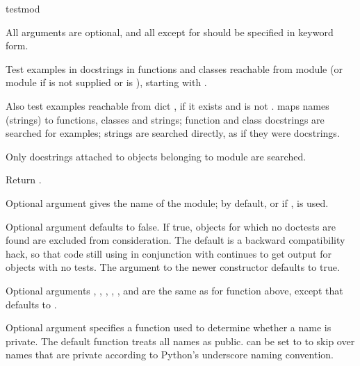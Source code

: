 \begin{funcdesc}{testmod}{}

  All arguments are optional, and all except for  should be
  specified in keyword form.

  Test examples in docstrings in functions and classes reachable
  from module  (or module  if  is not
  supplied or is ), starting with .

  Also test examples reachable from dict , if it
  exists and is not .   maps
  names (strings) to functions, classes and strings; function and class
  docstrings are searched for examples; strings are searched directly,
  as if they were docstrings.

  Only docstrings attached to objects belonging to module  are
  searched.

  Return .

  Optional argument  gives the name of the module; by default,
  or if ,  is used.

  Optional argument  defaults to false.  If true,
  objects for which no doctests are found are excluded from consideration.
  The default is a backward compatibility hack, so that code still
  using  in conjunction with
   continues to get output for objects with no tests.
  The  argument to the newer 
  constructor defaults to true.

  Optional arguments , , ,
  , , and  are the same as
  for function  above, except that 
  defaults to .

  Optional argument  specifies a function used to
  determine whether a name is private.  The default function treats
  all names as public.   can be set to
   to skip over names that are
  private according to Python's underscore naming convention.


\end{funcdesc}

